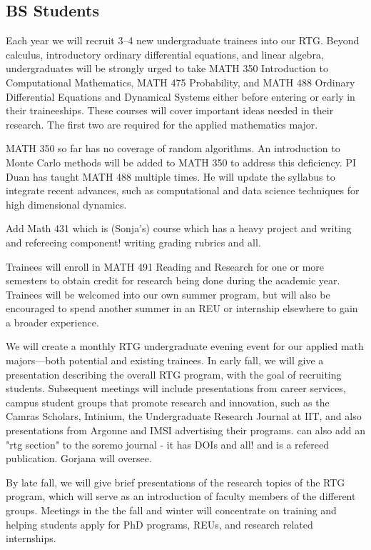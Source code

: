 \documentclass[11pt]{NSFamsart}
\begin{document}
\subsection*{BS Students} 

Each year we will recruit 3--4 new undergraduate trainees into our RTG.
Beyond calculus, introductory ordinary differential equations, and linear algebra, undergraduates will be strongly urged to take MATH 350 Introduction to Computational Mathematics, MATH 475 Probability, and MATH 488 Ordinary Differential Equations and Dynamical Systems either before entering or early in their traineeships.  These courses will cover important ideas needed in their research.  The first two are required for the applied mathematics major.  

MATH 350 so far has no coverage of random algorithms. An introduction to Monte Carlo methods will be added to MATH 350 to address this deficiency.
PI Duan has taught MATH 488 multiple  times.  He will update the syllabus to integrate recent advances, such as computational and data science techniques for high dimensional dynamics. 

Add Math 431 which is (Sonja's) course which has a heavy project and writing and refereeing component! writing grading rubrics and all. 

Trainees will enroll in MATH 491 Reading and Research for one or more semesters to obtain credit for research being done during the academic year.  Trainees will be welcomed into our own summer program, but will also be encouraged to spend another summer in an REU or internship elsewhere to gain a broader experience.

We will create a monthly RTG undergraduate evening event for our applied math majors---both potential and existing trainees.  In early fall, we will give a presentation describing the overall RTG program, with the goal of recruiting students. Subsequent meetings will include presentations from   career services, campus student groups that promote research and innovation, such as the Camras Scholars, Intinium, the Undergraduate Research Journal at IIT, and also presentations from Argonne and IMSI advertising their programs. 
{\color{magenta}can also add an "rtg section" to the soremo journal - it has DOIs and all! and is a refereed publication. Gorjana will oversee.} 

By late fall, we will give brief presentations of the research topics of the RTG program, which will serve as an introduction of faculty members of the different
groups. Meetings in the the fall and winter will concentrate on training and helping students apply for PhD programs, REUs, and research related internships. 
\end{document}
